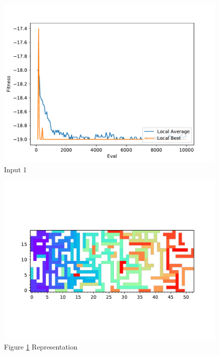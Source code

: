 \documentclass{standalone}
\begin{document}
\begin{figure}[!htb]
	\caption{Input 1}
	\label{fig:graph_1009}
	\includegraphics[width=\textwidth]{../graphs/graphs/1009.pdf}
\end{figure}


\begin{figure}[!htb]
	\caption{Figure \ref{fig:graph_1009} Representation}
	\label{fig:picture_1009}
	\includegraphics[width=\textwidth]{../graphs/picture/1009.pdf}
\end{figure}
\end{document}
